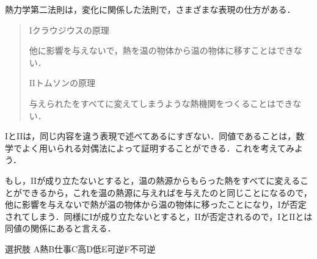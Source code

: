 \hspace{1zw}熱力学第二法則は，変化に関係した法則で，さまざまな表現の仕方がある．
\begin{quote}
\noindent $\mathrm{I}$\hspace{2zw}クラウジウスの原理\par
\hspace{2zw}他に影響を与えないで，熱を温の物体から温の物体に移すことはできない．\par
\noindent $\mathrm{I\!I}$\hspace{2zw}トムソンの原理\par
\hspace{2zw}与えられたをすべてに変えてしまうような熱機関をつくることはできない．
\end{quote}
\hspace{1zw}$\mathrm{I}$と$\mathrm{I\!I}$は，同じ内容を違う表現で述べてあるにすぎない．同値であることは，数学でよく用いられる対偶法によって証明することができる．これを考えてみよう．

\hspace{1zw}もし，$\mathrm{I\!I}$が成り立たないとすると，温の熱源からもらった熱をすべてに変えることができるから，これを温の熱源に与えればを与えたのと同じことになるので，他に影響を与えないで熱が温の物体から温の物体に移ったことになり，$\mathrm{I}$が否定されてしまう．同様に$\mathrm{I}$が成り立たないとすると，$\mathrm{I\!I}$が否定されるので，$\mathrm{I}$と$\mathrm{I\!I}$とは同値の関係にあると言える．

\begin{bsHosoku}{選択肢}
\noindent\hspace*{1zw}A\hspace{1zw}熱\hfill B\hspace{1zw}仕事\hfill C\hspace{1zw}高\hfill D\hspace{1zw}低\hfill E\hspace{1zw}可逆\hfill F\hspace{1zw}不可逆\hspace*{1zw}
\end{bsHosoku}

\newpage


